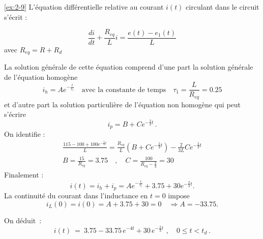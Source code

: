 \begin{solexercise}{\ref{ex:2-9}}
L'\'equation diff\'erentielle relative au courant $i(t)$ circulant dans le circuit s'\'ecrit :

\[\frac{di}{dt}+\frac{R_{eq}}{L}i=\frac{e(t)-e_1(t)}{L}\]
avec $R_{eq}=R+R_d$

La solution g\'en\'erale de cette \'equation comprend d'une part la solution g\'en\'erale de l'\'equation homog\`ene
\[i_h=Ae^{-\frac{t}{\tau_1}}\quad \text{avec la constante de temps} \quad \tau_1=\frac{L}{R_{eq}}=0.25\]
et d'autre part la solution particuli\`ere de l'\'equation non homog\`ene qui peut s'\'ecrire
\[i_p=B+Ce^{-\frac{2}{3}t} \, .\]
On identifie :
\begin{align*}
\frac{115-100+100e^{-\frac{2}{3}t}}{L}=\frac{R_{eq}}{L}(B+Ce^{-\frac{2}{3}t})-\frac{2}{3L}Ce^{-\frac{2}{3}t}\\
B=\frac{15}{R_{eq}}=3.75  \quad , \quad C=\frac{100}{R_{eq}-\frac{2}{3}}=30
\end{align*}
Finalement :
\[i(t)=i_h+i_p=Ae^{-\frac{t}{\tau_1}}+3.75 +30e^{-\frac{2}{3}t}.\]
La continuit\'e du courant dans l'inductance en $t=0$ impose
\[i_L(0)=i(0)=A+3.75 +30=0 \quad \Rightarrow A=-33.75.\]


On d\'eduit~:
\[ i(t) \: = \: 3.75 - 33.75 \, e^{-4t} + 30 \, e^{-\frac{2}{3} t} \,\,
, \quad 0\leq t < t_d~.\]


\end{solexercise}
